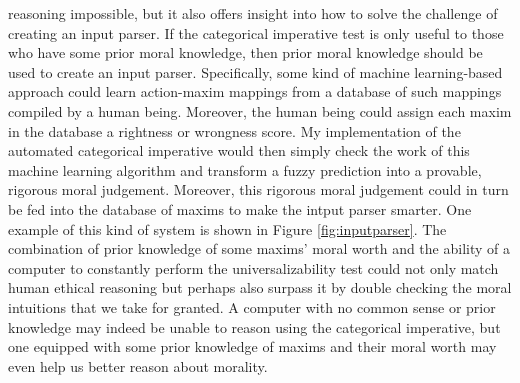 \begin{isabellebody}
\begin{isamarkuptext}
reasoning impossible, but it also offers insight into how to solve the challenge of creating an input parser.
If the categorical imperative test is only useful to those who have some prior moral knowledge, then prior moral
knowledge should be used to create an input parser. Specifically, some kind of machine learning-based approach
could learn action-maxim mappings from a database of such mappings compiled by a human being. Moreover, 
the human being could assign each maxim in the database a rightness or wrongness score. My implementation
of the automated categorical imperative would then simply check the work of this machine learning algorithm and transform
a fuzzy prediction into a provable, rigorous moral judgement. Moreover, this rigorous moral judgement
could in turn be fed into the database of maxims to make the intput parser smarter. One example of 
this kind of system is shown in Figure \ref{fig:inputparser}. The combination of 
prior knowledge of some maxims' moral worth and the ability of a computer to constantly perform the
universalizability test could not only match human ethical reasoning but perhaps also surpass it
by double checking the moral intuitions that we take for granted. A computer with no common sense or prior knowledge
may indeed be unable to reason using the categorical imperative, but one equipped with some prior knowledge
of maxims and their moral worth may even help us better reason about morality.%
\end{isamarkuptext}\isamarkuptrue%
%
\isadelimtheory
%
\endisadelimtheory
%
\isatagtheory
%
\endisatagtheory
{\isafoldtheory}%
%
\isadelimtheory
%
\endisadelimtheory
%
\end{isabellebody}%
\endinput
